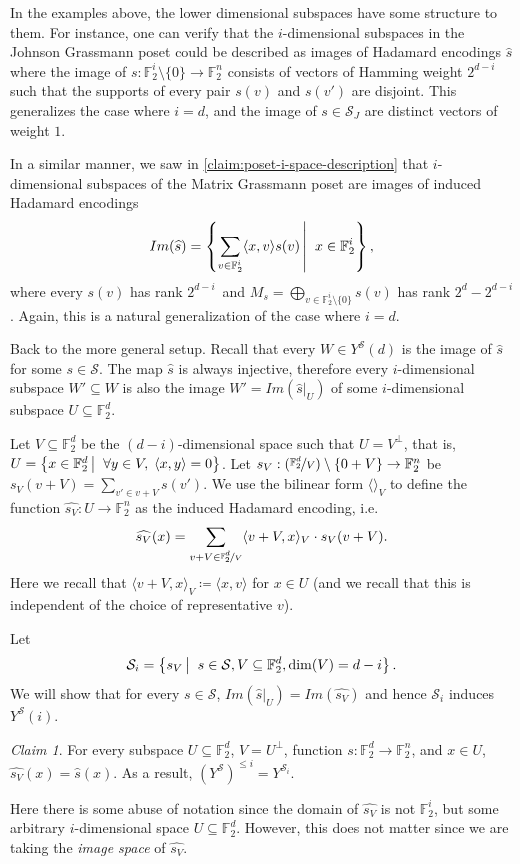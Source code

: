 \documentclass[10pt,a4paper]{article}
\newcommand{\prettyref}[1]{\cref{#1}}
\theoremstyle{definition}
\theoremstyle{remark}
\newtheorem{claim}[theorem]{Claim}
\newcommand\sett[2]{\left\{ #1 \left| \; \vphantom{#1 #2} \right. #2  \right\}}
\newcommand{\set}[1]{\{#1\}}
\newcommand{\iprod}[1]{\langle#1\rangle}
\def\dim{\mathrm{ dim}}
\newcommand{\F}{\mathbb{F}}
\renewcommand{\leq}{\leqslant}
\numberwithin{equation}{section}
\let\pref=\prettyref
\def\Y{Y}
\begin{document}
In the examples above, the lower dimensional subspaces have some structure to them. For instance, one can verify that the \(i\)-dimensional subspaces in the Johnson Grassmann poset could be described as images of Hadamard encodings \(\widehat{s}\) where the image of \(s:\F_2^{i}\setminus\set{0} \to \F_2^n\) consists of vectors of Hamming weight \(2^{d-i}\) such that the supports of every pair \(s(v)\) and \(s(v')\) are disjoint. This generalizes the case where \(i=d\), and the image of \(s \in \mathcal{S}_J\) are distinct vectors of weight \(1\).

In a similar manner, we saw in \pref{claim:poset-i-space-description} that \(i\)-dimensional subspaces of the Matrix Grassmann poset are images of induced Hadamard encodings
\[
    Im(\widehat{s}) = \sett{\sum_{v \in \F_2^{i}}\iprod{x,v} s(v)}{x \in \F_2^{i}},
\]
where every \(s(v)\) has rank \(2^{d-i}\)\, and \(M_s = \bigoplus_{v \in \F_2^{i} \setminus \set{0}} s(v)\) has rank \(2^d-2^{d-i}\). Again, this is a natural generalization of the case where \(i=d\).

Back to the more general setup. Recall that every \(W \in Y^{\mathcal{S}}(d)\) is the image of \(\widehat{s}\) for some \(s \in \mathcal{S}\). The map \(\widehat{s}\) is always injective, therefore every \(i\)-dimensional subspace \(W' \subseteq W\) is also the image \(W' = Im(\widehat{s}|_{U})\) of some \(i\)-dimensional subspace \(U \subseteq \F_2^d\). 

Let \(V \subseteq \F_2^d\) be the \((d-i)\)-dimensional space such that \(U=V^\perp\), that is, \(U = \sett{x \in \F_2^d}{\forall y \in V, \; \iprod{x,y} = 0}\). Let \(s_V:(\nicefrac{\F_2^d}{V}) \setminus \set{0+V} \to \F_2^n\) be \(s_V(v+V) = \sum_{v' \in v+V} s(v')\). We use the bilinear form \(\iprod{}_V\) to define the function \(\widehat{s_V}:U \to \F_2^n\) as the induced Hadamard encoding, i.e.\
\[\widehat{s_V}(x) = \sum_{v+V \in \nicefrac{\F_2^d}{V}} \iprod{v+V,x}_V \cdot s_V(v+V).\]
Here we recall that $\iprod{v+V,x}_V \coloneqq \iprod{x,v}$ for $x\in U$ (and we recall that this is independent of the choice of representative \(v\)).

Let
\[\mathcal{S}_i = \sett{s_V}{s \in \mathcal{S}, V \subseteq \F_2^d, \dim(V)=d-i}.\]
We will show that for every \(s \in \mathcal{S}\), \(Im(\widehat{s}|_U) = Im(\widehat{s_V})\) and hence \(\mathcal{S}_i\) induces \(\Y^{\mathcal{S}}(i)\).

\begin{claim} \label{claim:skeleton-of-induced-Grassmann}
    For every subspace \(U \subseteq \F_2^d\), \(V = U^\bot\), function \(s:\F_2^d \to \F_2^n\), and \(x \in U\), \(\widehat{s_V}(x)=\widehat{s}(x)\). As a result, \((Y^{\mathcal{S}})^{\leq i} = Y^{\mathcal{S}_i}\).
\end{claim}
Here there is some abuse of notation since the domain of \(\widehat{s_V}\) is not \(\F_2^i\), but some arbitrary \(i\)-dimensional space \(U \subseteq \F_2^d\). However, this does not matter since we are taking the \emph{image space} of \(\widehat{s_V}\).
\end{document}
